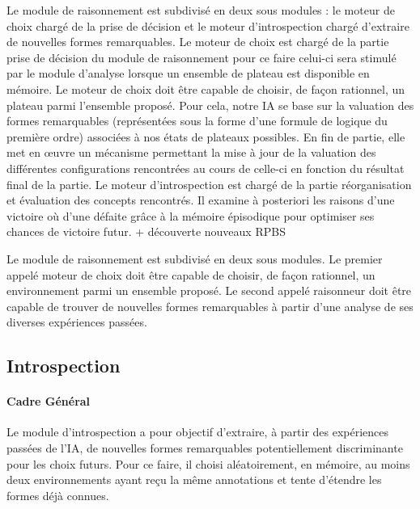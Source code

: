 
Le module de raisonnement est subdivisé en deux sous modules : le \og moteur de choix \fg{} chargé de la prise de décision et le \og moteur d'introspection \fg{} chargé d'extraire de nouvelles formes remarquables.
Le moteur de choix est chargé de la partie  prise de décision du module  de raisonnement pour ce faire celui-ci sera \og stimulé \fg{} par le module d'analyse lorsque un ensemble de plateau est disponible en mémoire. Le moteur de choix doit être capable de choisir, de façon rationnel, un plateau parmi l'ensemble proposé. Pour cela, notre IA se base sur la valuation des formes remarquables (représentées sous la forme d'une formule de logique du première ordre) associées à  nos  états de plateaux possibles. En fin de partie, elle met en œuvre un mécanisme permettant la mise à jour de la valuation des différentes \og configurations \fg{} rencontrées au cours de celle-ci en fonction du résultat final de la partie.
Le moteur d'introspection est chargé de la  partie réorganisation et évaluation des \og concepts \fg{} rencontrés. Il  examine à posteriori les raisons d'une victoire où d'une défaite grâce à  la mémoire épisodique pour optimiser ses chances de victoire futur. {+ découverte nouveaux RPBS}

Le module de raisonnement est subdivisé en deux sous modules. Le premier appelé \og moteur de choix \fg{} doit être capable de choisir, de façon rationnel, un environnement parmi un ensemble proposé. Le second appelé \og raisonneur \fg{} doit être capable de trouver de nouvelles formes remarquables à partir d'une analyse de ses diverses expériences passées.

\subsection{Introspection}

\paragraph{Cadre Général}

Le module d'introspection a pour objectif d'extraire, à partir des expériences passées de l'IA, de nouvelles formes remarquables potentiellement discriminante pour les choix futurs. Pour ce faire, il choisi aléatoirement, en mémoire, au moins deux environnements ayant reçu la même annotations et tente d'étendre les formes déjà connues.

